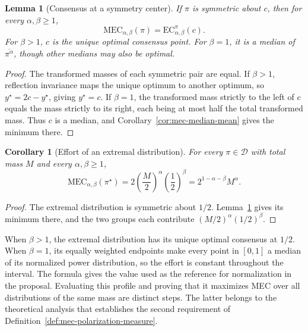 \documentclass{article}
\theoremstyle{plain}
\newtheorem{lemma}{Lemma}
\newtheorem{corollary}{Corollary}
\theoremstyle{remark}
\begin{document}
\begin{lemma}[Consensus at a symmetry center]\label{lem:mec-symmetry-center}
If $\pi$ is symmetric about $c$, then for every $\alpha,\beta\geq1$,
\[
\mathrm{MEC}_{\alpha,\beta}(\pi)
=\mathrm{EC}_{\alpha,\beta}^{\pi}(c).
\]
For $\beta>1$, $c$ is the unique optimal consensus point. For $\beta=1$, it is a median of $\overline{\pi^\alpha}$, though other medians may also be optimal.
\end{lemma}
\begin{proof}
The transformed masses of each symmetric pair are equal. If $\beta>1$, reflection invariance maps the unique optimum to another optimum, so $y^\star=2c-y^\star$, giving $y^\star=c$. If $\beta=1$, the transformed mass strictly to the left of $c$ equals the mass strictly to its right, each being at most half the total transformed mass. Thus $c$ is a median, and Corollary~\ref{cor:mec-median-mean} gives the minimum there.
\end{proof}

\begin{corollary}[Effort of an extremal distribution]\label{cor:mec-extremal-value}
For every $\pi\in\mathcal{D}$ with total mass $M$ and every $\alpha,\beta\geq1$,
\begin{equation}\label{eq:mec-extremal-value}
\mathrm{MEC}_{\alpha,\beta}(\pi^\star)
=2\left(\frac{M}{2}\right)^\alpha\left(\frac12\right)^\beta
=2^{1-\alpha-\beta}M^\alpha.
\end{equation}
\end{corollary}
\begin{proof}
The extremal distribution is symmetric about $1/2$. Lemma~\ref{lem:mec-symmetry-center} gives its minimum there, and the two groups each contribute $(M/2)^\alpha(1/2)^\beta$.
\end{proof}
When $\beta>1$, the extremal distribution has its unique optimal consensus at $1/2$. When $\beta=1$, its equally weighted endpoints make every point in $[0,1]$ a median of its normalized power distribution, so the effort is constant throughout the interval. The formula gives the value used as the reference for normalization in the proposal. Evaluating this profile and proving that it maximizes MEC over all distributions of the same mass are distinct steps. The latter belongs to the theoretical analysis that establishes the second requirement of Definition~\ref{def:mec-polarization-measure}.
\end{document}
